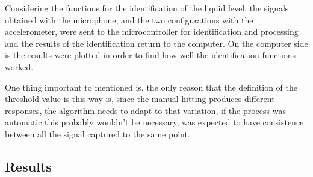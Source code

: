 Considering the functions for the identification of the liquid level, the signals obtained with the microphone, and the two configurations with the accelerometer, were sent to the microcontroller for identification and processing and the results of the identification return to the computer. On the computer side is the results were plotted in order to find how well the identification functions worked. 

One thing important to mentioned is, the only reason that the definition of the threshold value is this way is, since the manual hitting produces different responses, the algorithm needs to adapt to that variation, if the process was automatic this probably wouldn't be necessary, was expected to have consistence between all the signal captured to the same point.  
\subsection{Results}


\clearpage
